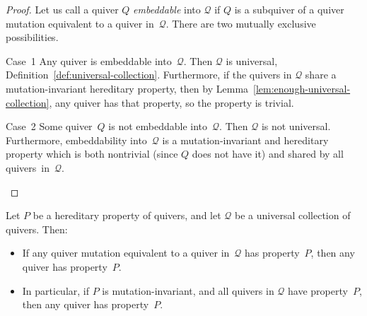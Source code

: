 \documentclass[ALCO,ThmDefs,Unicode,epreuves,published]{cedram}
\begin{document}
\begin{proof}
Let us call a quiver $Q$ \emph{embeddable} into $\mathcal{Q}$ if $Q$ is a subquiver of a quiver mutation equivalent to a quiver in~$\mathcal{Q}$. There are two mutually exclusive possibilities.

\begin{enonce*}[remark]{Case~1} Any quiver is embeddable into~$\mathcal{Q}$. Then $\mathcal{Q}$ is universal, \cf Definition~\ref{def:universal-collection}. Furthermore, if the quivers in $\mathcal{Q}$ share a mutation-invariant hereditary property, then by Lemma~\ref{lem:enough-universal-collection}, any quiver has that property, so the property is trivial. 
\end{enonce*}

\begin{enonce*}[remark]{Case~2} Some quiver~$Q$ is not embeddable into~$\mathcal{Q}$. Then $\mathcal{Q}$ is not universal. Furthermore, embeddability into~$\mathcal{Q}$ is a mutation-invariant and hereditary property which is both nontrivial (since $Q$ does not have it) and shared by all quivers~in~$\mathcal{Q}$. \qedhere
\end{enonce*}
\end{proof}

\begin{lemma}
\label{lem:enough-universal-collection}
Let $P$ be a hereditary property of quivers, 
and let $\mathcal{Q}$ be a universal collection of quivers. 
 Then: 
\begin{itemize}%
\item
If any quiver mutation equivalent to a quiver in~$\mathcal{Q}$ has property~$P$, 
then any quiver has property~$P$.
\item
In particular, if $P$ is mutation-invariant, and all quivers in $\mathcal{Q}$ have property~$P$, 
then any quiver has property~$P$.
\end{itemize}
\end{lemma}
\end{document}
